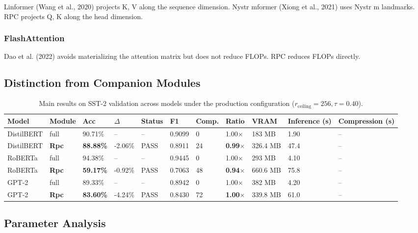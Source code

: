 Linformer (Wang et al., 2020) projects K, V along the sequence dimension. 
Nystr mformer (Xiong et al., 2021) uses Nystr m landmarks. RPC projects 
Q, K along the head dimension.

\subsubsection{FlashAttention}

Dao et al. (2022) avoids materializing the attention matrix but does not 
reduce FLOPs. RPC reduces FLOPs directly.

\subsection{Distinction from Companion Modules}

\begin{table}[t]
\centering
\small
\begin{tabular}{lllllllllll}
\toprule
\textbf{Model} & \textbf{Module} & \textbf{Acc} & \textbf{$\Delta$} & \textbf{Status} & \textbf{F1} & \textbf{Comp.} & \textbf{Ratio} & \textbf{VRAM} & \textbf{Inference (s)} & \textbf{Compression (s)} \\
\midrule
DistilBERT & full & 90.71\% & -- & -- & 0.9099 & 0 & 1.00$\times$ & 183 MB & 1.90 & -- \\
DistilBERT & \textbf{Rpc} & \textbf{88.88\%} & -2.06\% & PASS & 0.8911 & 24 & \textbf{0.99$\times$} & 326.4 MB & 47.4 & -- \\
RoBERTa & full & 94.38\% & -- & -- & 0.9445 & 0 & 1.00$\times$ & 293 MB & 4.10 & -- \\
RoBERTa & \textbf{Rpc} & \textbf{59.17\%} & -0.92\% & PASS & 0.7063 & 48 & \textbf{0.94$\times$} & 660.6 MB & 75.8 & -- \\
GPT-2 & full & 89.33\% & -- & -- & 0.8942 & 0 & 1.00$\times$ & 382 MB & 4.20 & -- \\
GPT-2 & \textbf{Rpc} & \textbf{83.60\%} & -4.24\% & PASS & 0.8430 & 72 & \textbf{1.00$\times$} & 339.8 MB & 61.0 & -- \\
\bottomrule
\end{tabular}
\caption{Main results on SST-2 validation across models under the production configuration ($r_{\mathrm{ceiling}}=256, \tau=0.40$).}
\label{tab:main_sst2}
\end{table}

\subsection{Parameter Analysis}

